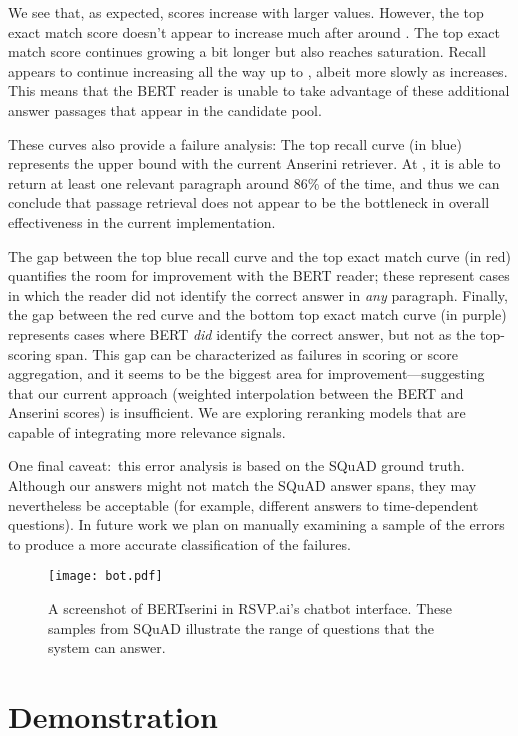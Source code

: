 \documentclass[11pt,a4paper]{article}
\begin{document}
We see that, as expected, scores increase with larger  values.
However, the top exact match score doesn't appear to increase much after around .
The top  exact match score continues growing a bit longer but also reaches saturation.
Recall appears to continue increasing all the way up to , albeit more slowly as  increases.
This means that the BERT reader is unable to take advantage of these additional answer passages that appear in the candidate pool.

These curves also provide a failure analysis:
The top recall curve (in blue) represents the upper bound with the current Anserini retriever.
At , it is able to return at least one relevant paragraph around 86\% of the time, and thus we can conclude that passage retrieval does not appear to be the bottleneck in overall effectiveness in the current implementation.

The gap between the top blue recall curve and the top  exact match curve (in red) quantifies the room for improvement with the BERT reader; these represent cases in which the reader did not identify the correct answer in {\it any} paragraph.
Finally, the gap between the red curve and the bottom top exact match curve (in purple) represents cases where BERT {\it did} identify the correct answer, but not as the top-scoring span.
This gap can be characterized as failures in scoring or score aggregation, and it seems to be the biggest area for improvement---suggesting that our current approach (weighted interpolation between the BERT and Anserini scores) is insufficient.
We are exploring reranking models that are capable of integrating more relevance signals.

One final caveat:\ this error analysis is based on the SQuAD ground truth.
Although our answers might not match the SQuAD answer spans, they may nevertheless be acceptable (for example, different answers to time-dependent questions).
In future work we plan on manually examining a sample of the errors to produce a more accurate classification of the failures.

\begin{figure}[t]
\vspace{0.15cm}
\centering\texttt{[image: bot.pdf]}
\caption{A screenshot of BERTserini in RSVP.ai's chatbot interface. These samples from SQuAD illustrate the range of questions that the system can answer.}
\label{fig:demo}
\end{figure}

\section{Demonstration}
\end{document}
